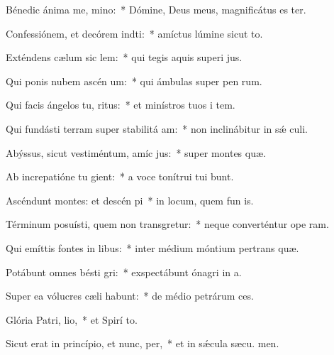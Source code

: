 \item Bénedic ánima me, mino:~* Dómine, Deus meus, magnificátus es ter.
\item Confessiónem, et decórem indti:~* amíctus lúmine sicut to.
\item Exténdens cælum sic lem:~* qui tegis aquis superi jus.
\item Qui ponis nubem ascén um:~* qui ámbulas super pen rum.
\item Qui facis ángelos tu, ritus:~* et minístros tuos i tem.
\item Qui fundásti terram super stabilitá am:~* non inclinábitur in sǽ culi.
\item Abýssus, sicut vestiméntum, amíc jus:~* super montes  quæ.
\item Ab increpatióne tu gient:~* a voce tonítrui tui bunt.
\item Ascéndunt montes: et descén pi~* in locum, quem fun is.
\item Términum posuísti, quem non transgretur:~* neque converténtur ope ram.
\item Qui emíttis fontes in libus:~* inter médium móntium pertrans quæ.
\item Potábunt omnes bésti gri:~* exspectábunt ónagri in  a.
\item Super ea vólucres cæli habunt:~* de médio petrárum  ces.
\item Glória Patri,  lio,~* et Spirí to.
\item Sicut erat in princípio, et nunc,  per,~* et in sǽcula sæcu. men.
